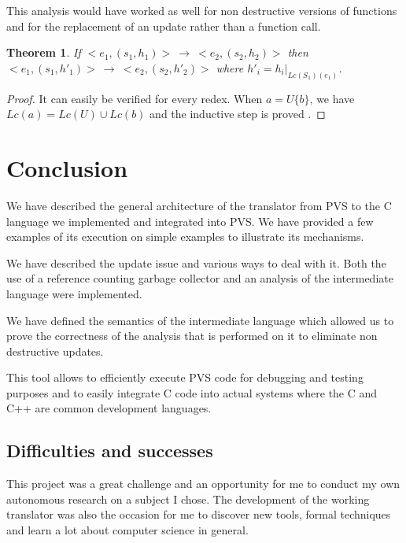 \documentclass[12pt,a4paper]{article}
\newtheorem{theorem}{Theorem}
\newcommand{\ucont}[1]{\{#1\}}
\begin{document}
This analysis would have worked as well for non destructive versions of functions and for the replacement of an update rather than a function call.



\begin{theorem}
If $<e_1, (s_1, h_1)> \ \longrightarrow \ <e_2, (s_2, h_2)>$ then $<e_1, (s_1, h'_1)> \ \longrightarrow \ <e_2, (s_2, h'_2)>$ where $h'_i = h_i|_{Lc(S_1)(e_1)}$.
\end{theorem}
\begin{proof}
It can easily be verified for every redex. When $a = U\ucont{b}$, we have $Lc(a) = Lc(U) \cup Lc(b)$ and the inductive step is proved .
\end{proof}









\newpage
\section{Conclusion}
\label{sec:Concl}

We have described the general architecture of the translator from PVS to the C language we implemented and integrated into PVS. We have provided a few examples of its execution on simple examples to illustrate its mechanisms.

We have described the update issue and various ways to deal with it. Both the use of a reference counting garbage collector and an analysis of the intermediate language were implemented.

We have defined the semantics of the intermediate language which allowed us to prove the correctness of the analysis that is performed on it to eliminate non destructive updates.

This tool allows to efficiently execute PVS code for debugging and testing purposes and to easily integrate C code into actual systems where the C and C++ are common development languages.



\subsection{Difficulties and successes}

This project was a great challenge and an opportunity for me to conduct my own autonomous research on a subject I chose. The development of the working translator was also the occasion for me to discover new tools, formal techniques and learn a lot about computer science in general.
\end{document}

